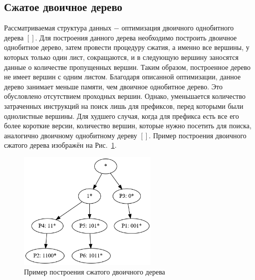 \documentclass[a4paper, 12pt, titlepage, finall]{extreport}
\begin{document}
        \subsection{Сжатое двоичное дерево}
            Рассматриваемая структура данных $-$ оптимизация двоичного однобитного дерева $[ ]$. Для построения данного дерева необходимо построить двоичное однобитное дерево, 
            затем провести процедуру сжатия, а именно все вершины, у которых только один лист, сокращаются, и в следующую вершину заносятся данные о 
            количестве пропущенных вершин. Таким образом, построенное дерево не имеет вершин с одним листом. Благодаря описанной оптимизации, данное дерево
            занимает меньше памяти, чем двоичное однобитное дерево. Это обусловлено отсутствием проходных вершин. Однако, уменьшается количество затраченных инструкций на поиск лишь 
            для префиксов, перед которыми были однолистные вершины. Для худшего случая, когда для префикса есть все его более короткие версии, количество вершин, 
            которые нужно посетить для поиска, аналогично двоичному однобитному дереву $[ ]$. Пример построения двоичного сжатого дерева изображён на Рис.~\ref{fig:mesh2}.

            \begin{figure}[h]
                \centering
                \includegraphics[width=0.6\textwidth]{compressed_binary.png}
                \caption{Пример построения сжатого двоичного дерева}\label{fig:mesh2}
            \end{figure}
\end{document}
